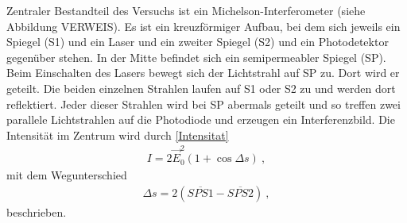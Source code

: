
Zentraler Bestandteil des Versuchs ist ein Michelson-Interferometer (siehe Abbildung VERWEIS). Es ist ein kreuzförmiger Aufbau, bei dem sich jeweils ein Spiegel (S1) und ein Laser und ein zweiter Spiegel (S2) und ein Photodetektor gegenüber stehen. In der Mitte befindet sich ein semipermeabler Spiegel (SP). \\
Beim Einschalten des Lasers bewegt sich der Lichtstrahl auf SP zu. Dort wird er geteilt. Die beiden einzelnen Strahlen laufen auf S1 oder S2 zu und werden dort reflektiert. Jeder dieser Strahlen wird bei SP abermals geteilt und so treffen zwei parallele Lichtstrahlen auf die Photodiode und erzeugen ein Interferenzbild. Die Intensität im Zentrum wird durch \eqref{Intensitat}
\begin{align}
	I = 2\vec{E}_0^2\left(1+\cos\Delta s\right) \ ,
\end{align}
mit dem Wegunterschied
\begin{align}
	\Delta s = 2(\overline{SPS1}-\overline{SPS2}) \ ,
\end{align}
beschrieben.
